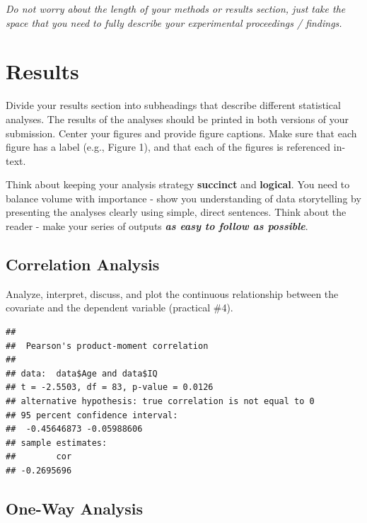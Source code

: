 \documentclass[
]{book}
\newenvironment{Shaded}{\begin{snugshade}}{\end{snugshade}}
\newcommand{\FunctionTok}[1]{\textcolor[rgb]{0.13,0.29,0.53}{\textbf{#1}}}
\newcommand{\NormalTok}[1]{#1}
\newcommand{\SpecialCharTok}[1]{\textcolor[rgb]{0.81,0.36,0.00}{\textbf{#1}}}
\begin{document}
\emph{Do not worry about the length of your methods or results section, just take the space that you need to fully describe your experimental proceedings / findings.}

\section*{Results}\label{results}

Divide your results section into subheadings that describe different statistical analyses. The results of the analyses should be printed in both versions of your submission. Center your figures and provide figure captions. Make sure that each figure has a label (e.g., Figure 1), and that each of the figures is referenced in-text.

Think about keeping your analysis strategy \textbf{succinct} and \textbf{logical}. You need to balance volume with importance - show you understanding of data storytelling by presenting the analyses clearly using simple, direct sentences. Think about the reader - make your series of outputs \textbf{\emph{as easy to follow as possible}}.

\subsection*{Correlation Analysis}\label{correlation-analysis}

Analyze, interpret, discuss, and plot the continuous relationship between the covariate and the dependent variable (practical \#4).

\begin{Shaded}
\end{Shaded}

\begin{verbatim}
## 
##  Pearson's product-moment correlation
## 
## data:  data$Age and data$IQ
## t = -2.5503, df = 83, p-value = 0.0126
## alternative hypothesis: true correlation is not equal to 0
## 95 percent confidence interval:
##  -0.45646873 -0.05988606
## sample estimates:
##        cor 
## -0.2695696
\end{verbatim}

\subsection*{One-Way Analysis}\label{one-way-analysis}
\end{document}
